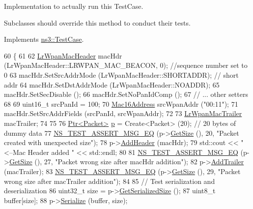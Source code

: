 Implementation to actually run this Test\+Case. 

Subclasses should override this method to conduct their tests. 

Implements \hyperlink{classns3_1_1TestCase_a8ff74680cf017ed42011e4be51917a24}{ns3\+::\+Test\+Case}.


\begin{DoxyCode}
60 \{
61 
62   \hyperlink{classns3_1_1LrWpanMacHeader}{LrWpanMacHeader} macHdr (LrWpanMacHeader::LRWPAN\_MAC\_BEACON, 0);        \textcolor{comment}{//sequence number
       set to 0}
63   macHdr.SetSrcAddrMode (LrWpanMacHeader::SHORTADDR);                    \textcolor{comment}{// short addr}
64   macHdr.SetDstAddrMode (LrWpanMacHeader::NOADDR);
65   macHdr.SetSecDisable ();
66   macHdr.SetNoPanIdComp ();
67   \textcolor{comment}{// ... other setters}
68 
69   uint16\_t srcPanId = 100;
70   \hyperlink{classns3_1_1Mac16Address}{Mac16Address} srcWpanAddr (\textcolor{stringliteral}{"00:11"});
71   macHdr.SetSrcAddrFields (srcPanId, srcWpanAddr);
72 
73   \hyperlink{classns3_1_1LrWpanMacTrailer}{LrWpanMacTrailer} macTrailer;
74 
75 
76   \hyperlink{classns3_1_1Ptr}{Ptr<Packet>} \hyperlink{lte__link__budget_8m_ac9de518908a968428863f829398a4e62}{p} = Create<Packet> (20);  \textcolor{comment}{// 20 bytes of dummy data}
77   \hyperlink{group__testing_ga2a9d78cffb3db8e867c35fff0b698cf5}{NS\_TEST\_ASSERT\_MSG\_EQ} (p->\hyperlink{classns3_1_1Packet_a462855c9929954d4301a4edfe55f4f1c}{GetSize} (), 20, \textcolor{stringliteral}{"Packet created with unexpected
       size"});
78   p->\hyperlink{classns3_1_1Packet_a465108c595a0bc592095cbcab1832ed8}{AddHeader} (macHdr);
79   std::cout << \textcolor{stringliteral}{" <--Mac Header added "} << std::endl;
80 
81   \hyperlink{group__testing_ga2a9d78cffb3db8e867c35fff0b698cf5}{NS\_TEST\_ASSERT\_MSG\_EQ} (p->\hyperlink{classns3_1_1Packet_a462855c9929954d4301a4edfe55f4f1c}{GetSize} (), 27, \textcolor{stringliteral}{"Packet wrong size after macHdr
       addition"});
82   p->\hyperlink{classns3_1_1Packet_ae26b490c30ae5bc98be5181ec6e06db8}{AddTrailer} (macTrailer);
83   \hyperlink{group__testing_ga2a9d78cffb3db8e867c35fff0b698cf5}{NS\_TEST\_ASSERT\_MSG\_EQ} (p->\hyperlink{classns3_1_1Packet_a462855c9929954d4301a4edfe55f4f1c}{GetSize} (), 29, \textcolor{stringliteral}{"Packet wrong size after macTrailer
       addition"});
84 
85   \textcolor{comment}{// Test serialization and deserialization}
86   uint32\_t size = p->\hyperlink{classns3_1_1Packet_a7416c3bc8c1a9a86c8ade4dfd1d67d2d}{GetSerializedSize} ();
87   uint8\_t buffer[size];
88   p->\hyperlink{classns3_1_1Packet_a939e41b065c6f9f77d3f51373baeaf7e}{Serialize} (buffer, size);

\end{DoxyCode}
